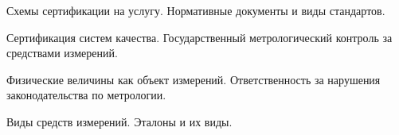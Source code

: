 \documentclass[
	14pt,
	a4paper,
	]
	{scrartcl}
\begin{document}
\vfill

\newpage


\shapk
{}
\setcounter{zad}{0}

\vfill
\z Схемы сертификации на услугу.
 \vfill
\z Нормативные документы и виды стандартов.
 \vfill

\vfill

\newpage


\shapk
{}
\setcounter{zad}{0}

\vfill
\z Сертификация систем качества.
 \vfill
\z Государственный метрологический контроль за средствами измерений.
 \vfill

\vfill

\newpage


\shapk
{}
\setcounter{zad}{0}

\vfill
\z Физические величины как объект измерений.
 \vfill
\z Ответственность за нарушения законодательства по метрологии.
 \vfill

\vfill

\newpage


\shapk
{}
\setcounter{zad}{0}

\vfill
\z Виды средств измерений.
 \vfill
\z Эталоны и их виды.
 \vfill

\vfill

\newpage
\end{document}

